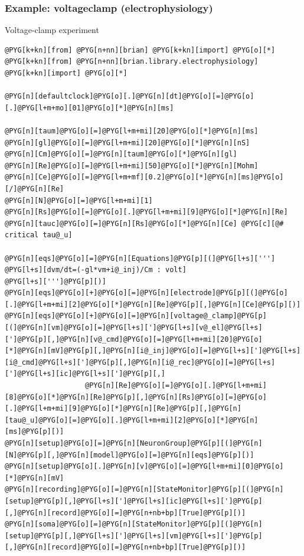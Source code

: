 \documentclass[letterpaper,10pt,english]{manual}
\begin{document}
\resetcurrentobjects
\hypertarget{--doc-examples-electrophysiology_voltageclamp}{}

\hypertarget{index-26}{}\subsubsection{Example: voltageclamp (electrophysiology)}

Voltage-clamp experiment

\begin{Verbatim}[commandchars=@\[\]]
@PYG[k+kn][from] @PYG[n+nn][brian] @PYG[k+kn][import] @PYG[o][*]
@PYG[k+kn][from] @PYG[n+nn][brian.library.electrophysiology] @PYG[k+kn][import] @PYG[o][*]

@PYG[n][defaultclock]@PYG[o][.]@PYG[n][dt]@PYG[o][=]@PYG[o][.]@PYG[l+m+mo][01]@PYG[o][*]@PYG[n][ms]

@PYG[n][taum]@PYG[o][=]@PYG[l+m+mi][20]@PYG[o][*]@PYG[n][ms]
@PYG[n][gl]@PYG[o][=]@PYG[l+m+mi][20]@PYG[o][*]@PYG[n][nS]
@PYG[n][Cm]@PYG[o][=]@PYG[n][taum]@PYG[o][*]@PYG[n][gl]
@PYG[n][Re]@PYG[o][=]@PYG[l+m+mi][50]@PYG[o][*]@PYG[n][Mohm]
@PYG[n][Ce]@PYG[o][=]@PYG[l+m+mf][0.2]@PYG[o][*]@PYG[n][ms]@PYG[o][/]@PYG[n][Re]
@PYG[n][N]@PYG[o][=]@PYG[l+m+mi][1]
@PYG[n][Rs]@PYG[o][=]@PYG[o][.]@PYG[l+m+mi][9]@PYG[o][*]@PYG[n][Re]
@PYG[n][tauc]@PYG[o][=]@PYG[n][Rs]@PYG[o][*]@PYG[n][Ce] @PYG[c][@# critical tau@_u]

@PYG[n][eqs]@PYG[o][=]@PYG[n][Equations]@PYG[p][(]@PYG[l+s][''']
@PYG[l+s][dvm/dt=(-gl*vm+i@_inj)/Cm : volt]
@PYG[l+s][''']@PYG[p][)]
@PYG[n][eqs]@PYG[o][+]@PYG[o][=]@PYG[n][electrode]@PYG[p][(]@PYG[o][.]@PYG[l+m+mi][2]@PYG[o][*]@PYG[n][Re]@PYG[p][,]@PYG[n][Ce]@PYG[p][)]
@PYG[n][eqs]@PYG[o][+]@PYG[o][=]@PYG[n][voltage@_clamp]@PYG[p][(]@PYG[n][vm]@PYG[o][=]@PYG[l+s][']@PYG[l+s][v@_el]@PYG[l+s][']@PYG[p][,]@PYG[n][v@_cmd]@PYG[o][=]@PYG[l+m+mi][20]@PYG[o][*]@PYG[n][mV]@PYG[p][,]@PYG[n][i@_inj]@PYG[o][=]@PYG[l+s][']@PYG[l+s][i@_cmd]@PYG[l+s][']@PYG[p][,]@PYG[n][i@_rec]@PYG[o][=]@PYG[l+s][']@PYG[l+s][ic]@PYG[l+s][']@PYG[p][,]
                   @PYG[n][Re]@PYG[o][=]@PYG[o][.]@PYG[l+m+mi][8]@PYG[o][*]@PYG[n][Re]@PYG[p][,]@PYG[n][Rs]@PYG[o][=]@PYG[o][.]@PYG[l+m+mi][9]@PYG[o][*]@PYG[n][Re]@PYG[p][,]@PYG[n][tau@_u]@PYG[o][=]@PYG[o][.]@PYG[l+m+mi][2]@PYG[o][*]@PYG[n][ms]@PYG[p][)]
@PYG[n][setup]@PYG[o][=]@PYG[n][NeuronGroup]@PYG[p][(]@PYG[n][N]@PYG[p][,]@PYG[n][model]@PYG[o][=]@PYG[n][eqs]@PYG[p][)]
@PYG[n][setup]@PYG[o][.]@PYG[n][v]@PYG[o][=]@PYG[l+m+mi][0]@PYG[o][*]@PYG[n][mV]
@PYG[n][recording]@PYG[o][=]@PYG[n][StateMonitor]@PYG[p][(]@PYG[n][setup]@PYG[p][,]@PYG[l+s][']@PYG[l+s][ic]@PYG[l+s][']@PYG[p][,]@PYG[n][record]@PYG[o][=]@PYG[n+nb+bp][True]@PYG[p][)]
@PYG[n][soma]@PYG[o][=]@PYG[n][StateMonitor]@PYG[p][(]@PYG[n][setup]@PYG[p][,]@PYG[l+s][']@PYG[l+s][vm]@PYG[l+s][']@PYG[p][,]@PYG[n][record]@PYG[o][=]@PYG[n+nb+bp][True]@PYG[p][)]


\end{Verbatim}
\end{document}
